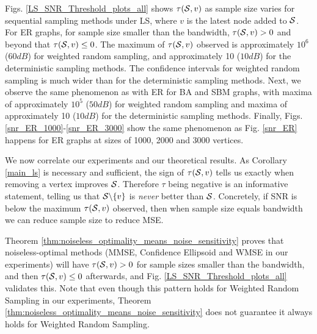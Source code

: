 Figs. \ref{LS_SNR_Threshold_plots_all}  shows $\tau(\mathcal{S},v)$ as sample size varies for sequential sampling methods under LS, where $v$ is the latest node added to $\mathcal{S}$. 
     For ER graphs, for sample size smaller than the bandwidth, $\tau(\mathcal{S},v) > 0$ and beyond that $\tau(\mathcal{S},v) \leq 0$. The maximum of $\tau(\mathcal{S},v)$ observed is approximately $10^{6}$ ($60dB$) for weighted random sampling, and approximately 10 ($10dB$) for the deterministic sampling methods. The confidence intervals for weighted random sampling is much wider than for the deterministic sampling methods.
     Next, we observe the same phenomenon as with ER for BA and SBM graphs, with maxima of approximately $10^5$ ($50dB$) for weighted random sampling and maxima of approximately 10 ($10dB$) for the deterministic sampling methods.
Finally, Figs. \ref{snr_ER_1000}-\ref{snr_ER_3000} show the same phenomenon as Fig. \ref{snr_ER} happens for ER graphs at sizes of 1000, 2000 and 3000 vertices.

 We now correlate our experiments and our theoretical results. As Corollary \ref{main_ls} is necessary and sufficient, the sign of $\tau(\mathcal{S},v)$ tells us exactly when removing a vertex improves $\mathcal{S}$. Therefore $\tau$ being negative is an informative statement, telling us that $\mathcal{S} \backslash \{v\}$ is \emph{never} better than $\mathcal{S}$. Concretely, if SNR is below the maximum $\tau(\mathcal{S},v)$ observed, then when sample size equals bandwidth we can reduce sample size to reduce MSE.

 Theorem \ref{thm:noiseless_optimality_means_noise_sensitivity} proves that noiseless-optimal methods (MMSE, Confidence Ellipsoid and WMSE in our experiments) will have $\tau(\mathcal{S},v) > 0$ for sample sizes smaller than the bandwidth, and then $\tau(\mathcal{S},v) \leq 0$ afterwards, and Fig. \ref{LS_SNR_Threshold_plots_all}  validates this. Note that even though this pattern holds for Weighted Random Sampling in our experiments, Theorem \ref{thm:noiseless_optimality_means_noise_sensitivity} does not guarantee it always holds for Weighted Random Sampling.

